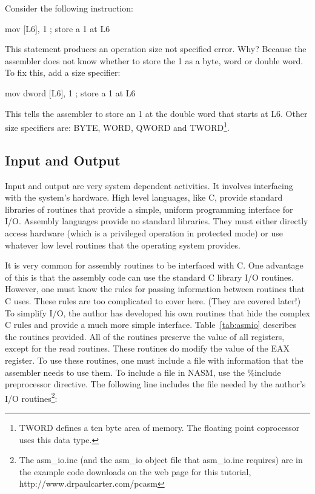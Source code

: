 Consider the following instruction:
\begin{AsmCodeListing}[frame=none, numbers=none]
      mov    [L6], 1             ; store a 1 at L6
\end{AsmCodeListing}
This statement produces an {\code operation size not specified} error. Why?
Because the assembler does not know whether to store the 1 as a byte, word
or double word. To fix this, add a size specifier:
\begin{AsmCodeListing}[frame=none, numbers=none]
      mov    dword [L6], 1       ; store a 1 at L6
\end{AsmCodeListing}
This tells the assembler to store an 1 at the double word that starts at
{\code L6}. Other size specifiers are: {\code BYTE}, {\code WORD},
{\code QWORD} and {\code TWORD}\footnote{{\code TWORD} defines a ten byte
area of memory. The floating point coprocessor uses this data type.}.

\subsection{Input and Output }

Input and output are very system dependent activities. It involves
interfacing with the system's hardware. High level languages, like C,
provide standard libraries of routines that provide a simple, uniform
programming interface for I/O.  Assembly languages provide no standard
libraries. They must either directly access hardware (which is a privileged
operation in protected mode) or use whatever low level routines that the
operating system provides.

It is very common for assembly routines to be interfaced with C. One
advantage of this is that the assembly code can use the standard C
library I/O routines.  However, one must know the rules for passing
information between routines that C uses. These rules are too
complicated to cover here. (They are covered later!) To simplify I/O,
the author has developed his own routines that hide the complex C
rules and provide a much more simple interface.  Table~\ref{tab:asmio}
describes the routines provided. All of the routines preserve the
value of all registers, except for the read routines. These routines
do modify the value of the EAX register. To use these routines, one
must include a file with information that the assembler needs to use
them.  To include a file in NASM, use the {\code \%include}
preprocessor directive. The following line includes the file needed by
the author's I/O routines\footnote{The {\code asm\_io.inc} (and the
{\code asm\_io} object file that {\code asm\_io.inc} requires) are in
the example code downloads on the web page for this tutorial, {\code
http://www.drpaulcarter.com/pcasm}}:
\begin{AsmCodeListing}[frame=none, numbers=none]
\end{AsmCodeListing}

